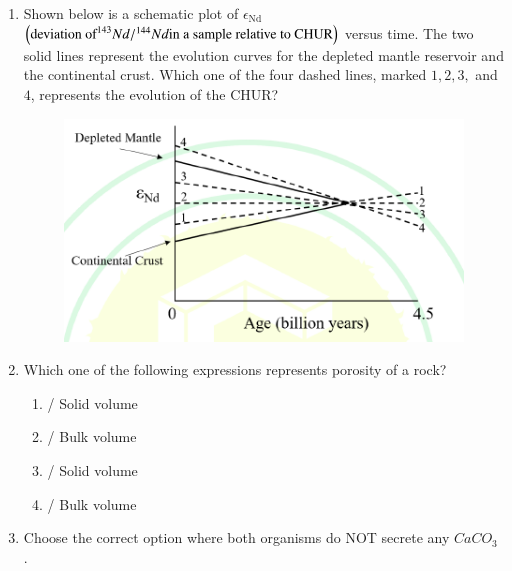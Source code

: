 \documentclass[journal,12pt,onecolumn]{IEEEtran}
\theoremstyle{remark}
\begin{document}
\begin{enumerate}
\item Shown below is a schematic plot of $\epsilon_{\text{Nd}}$ $\left(\text{deviation of} ^{143}Nd/^{144}Nd \text{in a sample relative to CHUR}\right)$ versus time. The two solid lines represent the evolution curves for the depleted mantle reservoir and the continental crust. Which one of the four dashed lines, marked $1, 2, 3,$ and $4$, represents the evolution of the CHUR?
\begin{figure}[H]
    \centering
    \includegraphics[width=0.6\columnwidth]{figs/fig6.png}
    \caption{}
    \label{fig:q30}
\end{figure}
\hfill{}
\begin{enumerate}
\end{enumerate}

\item Which one of the following expressions represents porosity of a rock? \hfill{}
\begin{enumerate}
    \item {} / Solid volume
    \item {} / Bulk volume
    \item {} / Solid volume
    \item {} / Bulk volume
\end{enumerate}

\item Choose the correct option where both organisms do NOT secrete any $CaCO_3$ . \hfill{}
\begin{enumerate}
\end{enumerate}


\end{enumerate}
\end{document}

